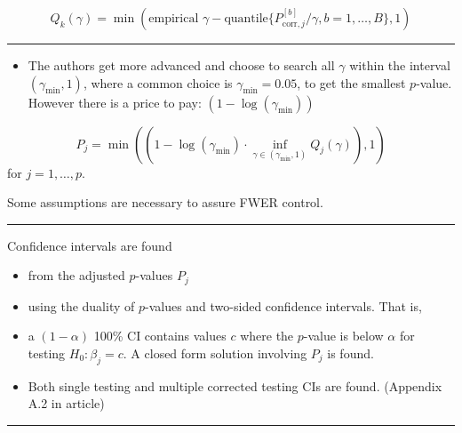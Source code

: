 \documentclass[
  letterpaper,
  DIV=11,
  numbers=noendperiod]{scrartcl}
\providecommand{\tightlist}{%
  \setlength{\itemsep}{0pt}\setlength{\parskip}{0pt}}\usepackage{longtable,booktabs,array}
\begin{document}
\[Q_k(\gamma)=\min(\text{empirical }\gamma- \text{quantile} \{ P_{\text{corr},j}^{[b]}/\gamma,b=1,\ldots, B\},1)\]

\begin{center}\rule{0.5\linewidth}{0.5pt}\end{center}

\begin{itemize}
\tightlist
\item
  The authors get more advanced and choose to search all \(\gamma\)
  within the interval \((\gamma_{\text{min}},1)\), where a common choice
  is \(\gamma_{\text{min}}=0.05\), to get the smallest \(p\)-value.
  However there is a price to pay: \((1-\log(\gamma_{\text{min}}))\)
\end{itemize}

\[ P_j=\min((1-\log(\gamma_{\text{min}})\cdot \inf_{\gamma \in (\gamma_{\text{min}},1)} Q_j(\gamma)),1)\]
for \(j=1,\ldots,p\).

Some assumptions are necessary to assure FWER control.

\begin{center}\rule{0.5\linewidth}{0.5pt}\end{center}

Confidence intervals are found

\begin{itemize}
\tightlist
\item
  from the adjusted \(p\)-values \(P_j\)
\item
  using the duality of \(p\)-values and two-sided confidence intervals.
  That is,
\item
  a \((1-\alpha)\) 100\% CI contains values \(c\) where the \(p\)-value
  is below \(\alpha\) for testing \(H_0: \beta_j=c\). A closed form
  solution involving \(P_j\) is found.
\item
  Both single testing and multiple corrected testing CIs are found.
  (Appendix A.2 in article)
\end{itemize}

\begin{center}\rule{0.5\linewidth}{0.5pt}\end{center}

\footnotesize
\end{document}
